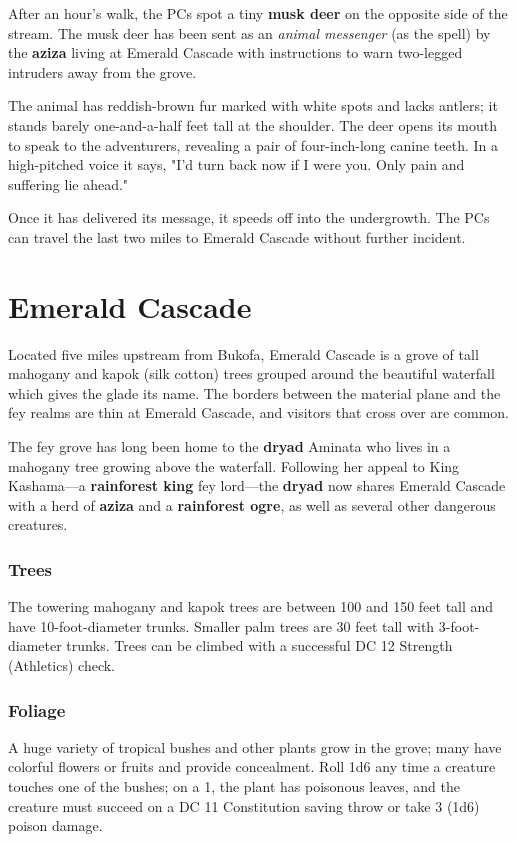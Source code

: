 \documentclass[10pt,a4paper,twoside,bg=print,twocolumn,openany,nodeprecatedcode]{dndbook}
\begin{document}
After an hour's walk, the PCs spot a tiny \textbf{musk deer} on the opposite side of the stream. The musk deer has been sent as an \textit{animal messenger} (as the spell) by the \textbf{aziza} living at Emerald Cascade with instructions to warn two-legged intruders away from the grove.

The animal has reddish-brown fur marked with white spots and lacks antlers; it stands barely one-and-a-half feet tall at the shoulder. The deer opens its mouth to speak to the adventurers, revealing a pair of four-inch-long canine teeth. In a high-pitched voice it says, "I'd turn back now if I were you. Only pain and suffering lie ahead."

Once it has delivered its message, it speeds off into the undergrowth. The PCs can travel the last two miles to Emerald Cascade without further incident.

\section{Emerald Cascade}
Located five miles upstream from Bukofa, Emerald Cascade is a grove of tall mahogany and kapok (silk cotton) trees grouped around the beautiful waterfall which gives the glade its name. The borders between the material plane and the fey realms are thin at Emerald Cascade, and visitors that cross over are common.

The fey grove has long been home to the \textbf{dryad} Aminata who lives in a mahogany tree growing above the waterfall. Following her appeal to King Kashama—a \textbf{rainforest king} fey lord—the \textbf{dryad} now shares Emerald Cascade with a herd of \textbf{aziza} and a \textbf{rainforest ogre}, as well as several other dangerous creatures.

\subsubsection{Trees}
The towering mahogany and kapok trees are between 100 and 150 feet tall and have 10-foot-diameter trunks. Smaller palm trees are 30 feet tall with 3-foot-diameter trunks. Trees can be climbed with a successful DC 12 Strength (Athletics) check.

\subsubsection{Foliage}
A huge variety of tropical bushes and other plants grow in the grove; many have colorful flowers or fruits and provide concealment. Roll 1d6 any time a creature touches one of the bushes; on a 1, the plant has poisonous leaves, and the creature must succeed on a DC 11 Constitution saving throw or take 3 (1d6) poison damage.
\end{document}
